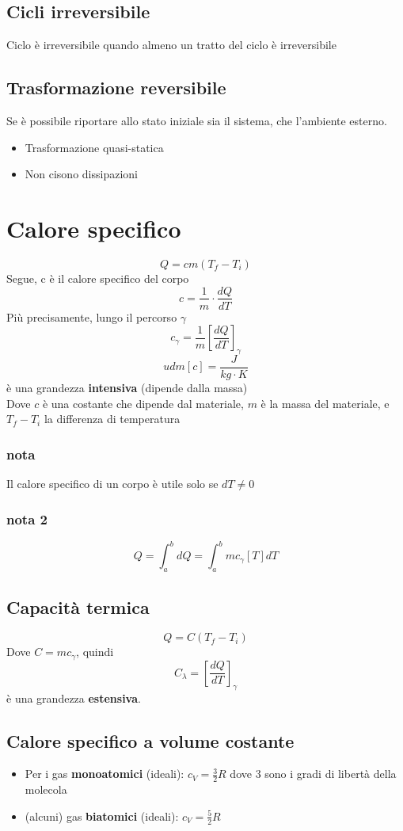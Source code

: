 \documentclass[a4paper]{report}
\begin{document}
  \subsection{Cicli irreversibile}
  Ciclo è irreversibile quando almeno un tratto del ciclo è irreversibile

  \subsection{Trasformazione reversibile}
  Se è possibile riportare allo stato iniziale sia il sistema, che l'ambiente esterno.
  \begin{itemize}
    \item Trasformazione quasi-statica
    \item Non cisono dissipazioni
  \end{itemize}

  \section{Calore specifico}
  \[ Q = cm(T_f - T_i) \]
  Segue, c è il calore specifico del corpo
  \[ c = \frac{1}{m} \cdot \frac{dQ}{dT} \]
  Più precisamente, lungo il percorso $\gamma$
  \[ c_\gamma = \frac{1}{m} [\frac{dQ}{dT}]_\gamma \]
  \[ udm[c] = \frac{J}{kg\cdot K} \]
  è una grandezza \textbf{intensiva} (dipende dalla massa)\\
  Dove $c$ è una costante che dipende dal materiale, $m$ è la massa del materiale, e $T_f - T_i$ la differenza di temperatura
  \subsubsection{nota}
  Il calore specifico di un corpo è utile solo se $dT \neq 0$
  \subsubsection{nota 2}
  \[ Q = \int_{a}^b dQ = \int_a^b m c_\gamma[T] dT \]
  \subsection{Capacità termica}
  \[ Q = C(T_f-T_i) \]
  Dove $C = mc_\gamma$, quindi
  \[ C_\lambda = [\frac{dQ}{dT}]_\gamma \]
  è una grandezza \textbf{estensiva}.
  \subsection{Calore specifico a volume costante}
  \begin{itemize}
    \item Per i gas \textbf{monoatomici} (ideali):  $c_V = \frac{3}{2}R$ dove $3$ sono i gradi di libertà della molecola
    \item (alcuni) gas \textbf{biatomici} (ideali):  $c_V = \frac{5}{2}R$
  \end{itemize}
\end{document}
